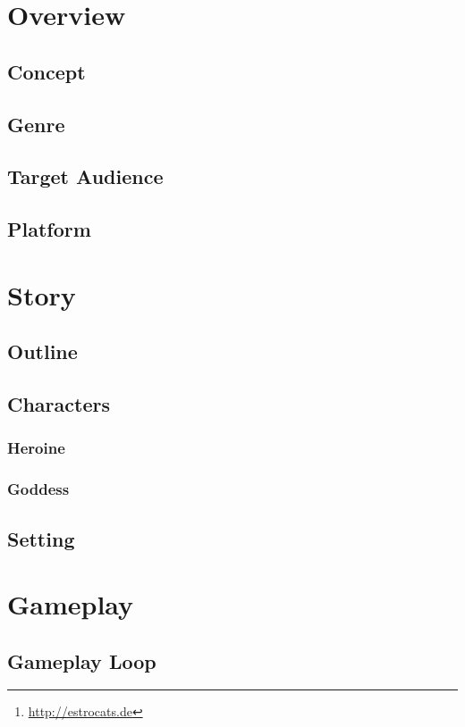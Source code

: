 \documentclass[pdftex,12pt,a4paper,ngerman,dvipsnames]{scrreport}
\title{\worktitle}
\subtitle{An Estrocats\footnote{\url{http://estrocats.de}} game}
\author{\authors}
\begin{document}
\pagestyle{empty}
\maketitle
\pagestyle{empty} \cleardoublepage
\tableofcontents
\cleardoublepage 
{}
\pagestyle{fancy}
\chapter{Overview}
\section{Concept}
\section{Genre}
\section{Target Audience}
\section{Platform}
\chapter{Story}
\section{Outline}
\section{Characters}
\subsection{Heroine}
\subsection{Goddess}
\section{Setting}
\chapter{Gameplay}
\section{Gameplay Loop}
\end{document}
